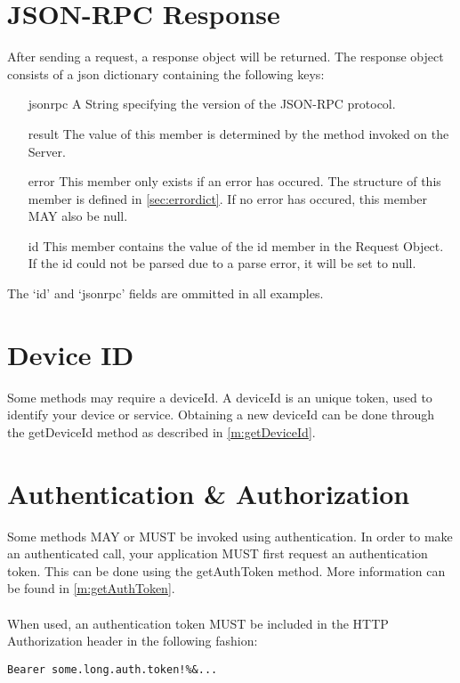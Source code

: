 \documentclass[a4paper]{scrreprt}
\begin{document}
\section{JSON-RPC Response}
After sending a request, a response object will be returned. The response object consists of a json dictionary containing the following keys:
\begin{enumerate}
\item[jsonrpc]
A String specifying the version of the JSON-RPC protocol.
\item[result]
The value of this member is determined by the method invoked on the Server.
\item[error]
This member only exists if an error has occured. The structure of this member is defined in \autoref{sec:errordict}. If no error has occured, this member MAY also be null.
\item[id]
This member contains the value of the id member in the Request Object. If the id could not be parsed due to a parse error, it will be set to null.
\end{enumerate}
The `id' and `jsonrpc' fields are ommitted in all examples.

\clearpage

\section{Device ID}
Some methods may require a deviceId. A deviceId is an unique token, used to identify your device or service. Obtaining a new deviceId can be done through the getDeviceId method as described in \autoref{m:getDeviceId}.

\section{Authentication \& Authorization}
Some methods MAY or MUST be invoked using authentication. In order to make an authenticated call, your application MUST first request an authentication token. This can be done using the getAuthToken method. More information can be found in \autoref{m:getAuthToken}.\\\\
When used, an authentication token MUST be included in the HTTP Authorization header in the following fashion:
\begin{lstlisting}
Bearer some.long.auth.token!%&...
\end{lstlisting}
\end{document}
